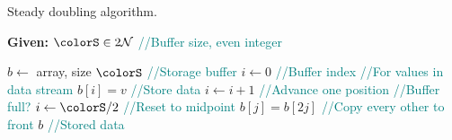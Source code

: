 \begin{algorithm}[H]
\caption{Steady doubling algorithm.}
\label{alg:steady-doubling}
\begin{minipage}{0.5\textwidth}
    \hspace*{\algorithmicindent} \textbf{Given:} $\colorS \in 2\mathcal{N}$ \textcolor{teal}{\small//Buffer size, even integer}
    \hspace*{\algorithmicindent}    \begin{algorithmic}[1]
        \State $b \gets$ array, size $\colorS$ \textcolor{teal}{\small//Storage buffer}
        \State $i \gets 0$ \textcolor{teal}{\small//Buffer index}
         \textcolor{teal}{\small//For values in data stream}
        \State $b[i] = v$ \textcolor{teal}{\small//Store data}
        \State $i \gets i + 1$  \textcolor{teal}{\small//Advance one position}
         \textcolor{teal}{\small//Buffer full?}
        \State $i \gets \colorS / 2$ \textcolor{teal}{\small//Reset to midpoint}
        \For{$j \in [0\twodots \colorS/2)$}
        \State $b[j] = b[2j]$ \textcolor{teal}{\small//Copy every other to front}
        \EndFor
        \EndIf
        \EndFor
        \Return $b$ \textcolor{teal}{\small//Stored data}
    \end{algorithmic}
\end{minipage}
\end{algorithm}
